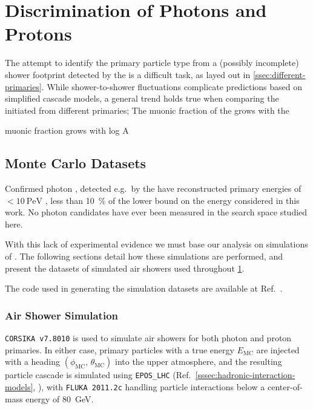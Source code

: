 
\chapter{Discrimination of Photons and Protons}
\label{chap:chapter-4}

The attempt to identify the primary particle type from a (possibly incomplete) 
\EAS shower footprint detected by the \SD is a difficult task, as layed out in 
\cref{ssec:different-primaries}. While shower-to-shower fluctuations complicate 
predictions based on simplified cascade models, a general trend holds true when
comparing the \EASs initiated from different primaries; The muonic fraction of
the \EAS grows with the 

muonic fraction grows with log A

\section{Monte Carlo Datasets}

Confirmed photon \CRs, detected e.g.~by the \LHAASO have reconstructed primary 
energies of $<\SI{10}{\peta\eV}$ 
\cite{lhaasocollaborationUltrahighenergyRayBubble2024}, less than 
\SI{10}{\percent} of the lower bound on the energy considered in this work. No 
photon candidates have ever been measured in the search space studied here.

With this lack of experimental evidence we must base our analysis on simulations
of \EASs. The following sections detail how these simulations are performed, and
present the datasets of simulated air showers used throughout 
\cref{chap:chapter-4}.

The code used in generating the simulation datasets are available at 
Ref.~\cite{AugerobservatorySandBoxesPaulfilip2026}.

\subsection{Air Shower Simulation}

\texttt{CORSIKA v7.8010} \cite{engelNextGenerationCORSIKA2018} is used to 
simulate air showers for both photon and proton primaries. In either case, 
primary particles with a true energy $E_\mathrm{MC}$ are injected with a heading
$(\phi_\mathrm{MC},\,\theta_\mathrm{MC})$ into the upper atmosphere, and the 
resulting particle cascade is simulated using \texttt{EPOS\_LHC} 
(Ref.~\cref{sssec:hadronic-interaction-models}, \cite{pierogEPOSLHCTest2015}), 
with \texttt{FLUKA  2011.2c} \cite{theflukacollaborationFLUKACodeOverview2024} 
handling particle interactions below a center-of-mass energy of 
\SI{80}{\giga\eV}.

